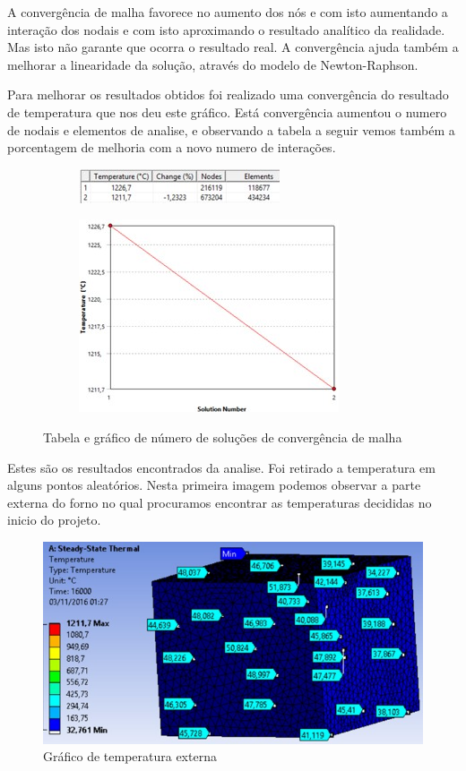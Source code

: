 A convergência de malha favorece no aumento dos nós e com isto aumentando a interação
dos nodais e com isto aproximando o resultado analítico da realidade. Mas isto não garante que
ocorra o resultado real. A convergência ajuda também a melhorar a linearidade da solução, através
do modelo de Newton-Raphson.

Para melhorar os resultados obtidos foi realizado uma convergência do resultado de
temperatura que nos deu este gráfico. Está convergência aumentou o numero de nodais e
elementos de analise, e observando a tabela a seguir vemos também a porcentagem de melhoria
com a novo numero de interações.
\begin{figure}[H]
\centering
    \begin{subfigure}{0.49\linewidth} \centering
        \includegraphics[scale=1]{figuras/ansys_tab.jpg}
        \label{ansys_tab}
    \end{subfigure}
    \begin{subfigure}{0.49\linewidth} \centering
        \includegraphics[scale=1]{figuras/ansys_graf.jpg}
        \label{ansys_graf}
    \end{subfigure}
    \caption{Tabela e gráfico de número de soluções de convergência de malha}
\end{figure}

Estes são os resultados encontrados da analise. Foi retirado a temperatura em alguns pontos
aleatórios. Nesta primeira imagem podemos observar a parte externa do forno no qual procuramos
encontrar as temperaturas decididas no inicio do projeto.
\begin{figure}[H]
	\centering
	\label{ansys17}
	\includegraphics[keepaspectratio=true,scale=1.0]{figuras/ansys17.jpg}
    \caption{Gráfico de temperatura externa}
\end{figure}

